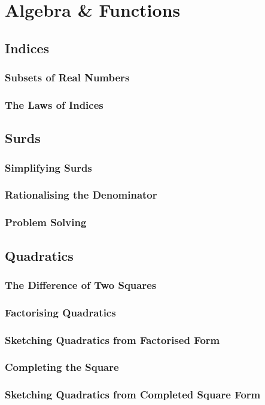\documentclass[../alevelmaths.tex]{subfiles}
\begin{document}
\chapter{Algebra \& Functions}
\section{Indices}
\subsection*{Subsets of Real Numbers}
\subsection*{The Laws of Indices}
\section{Surds}
\subsection*{Simplifying Surds}
\subsection*{Rationalising the Denominator}
\subsection*{Problem Solving}
\section{Quadratics}
\subsection*{The Difference of Two Squares}
\subsection*{Factorising Quadratics}
\subsection*{Sketching Quadratics from Factorised Form}
\subsection*{Completing the Square}
\subsection*{Sketching Quadratics from Completed Square Form}
\end{document}
